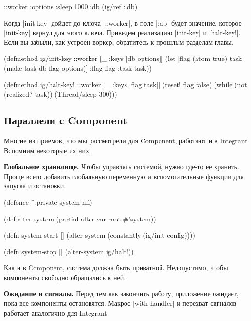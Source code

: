 \begin{english}
  \begin{clojure}
{::worker {:options {:sleep 1000}
           :db (ig/ref ::db)}}
  \end{clojure}
\end{english}

Когда \spverb|init-key| дойдет до ключа \spverb|::worker|, в поле \spverb|:db|
будет значение, которое \spverb|init-key| вернул для этого ключа. Приведем
реализацию \spverb|init-key| и \spverb|halt-key!|. Если вы забыли, как устроен
воркер, обратитесь к прошлым разделам главы.

\begin{english}
  \begin{clojure}
(defmethod ig/init-key ::worker
  [_ {:keys [db options]}]
  (let [flag (atom true)
        task (make-task db flag options)]
    {:flag flag :task task}))

(defmethod ig/halt-key! ::worker
  [_ {:keys [flag task]}]
  (reset! flag false)
  (while (not (realized? task))
    (Thread/sleep 300)))
  \end{clojure}
\end{english}

\subsection{Параллели с Component}

Многие из приемов, что мы рассмотрели для Component, работают и в
Integrant Вспомним некоторые их них.

\textbf{Глобальное хранилище.} Чтобы управлять системой, нужно где-то ее
хранить. Проще всего добавить глобальную переменную и вспомогательные функции
для запуска и остановки.

\begin{english}
  \begin{clojure}
(defonce ^:private system nil)

(def alter-system (partial alter-var-root #'system))

(defn system-start []
  (alter-system (constantly (ig/init config))))

(defn system-stop []
  (alter-system ig/halt!))
  \end{clojure}
\end{english}

Как и в Component, система должна быть приватной. Недопустимо, чтобы
компоненты свободно обращались к ней.

\textbf{Ожидание и сигналы.} Перед тем как закончить работу, приложение ожидает,
пока все компоненты остановятся. Макрос \spverb|with-handler| и перехват
сигналов работает аналогично для Integrant:


